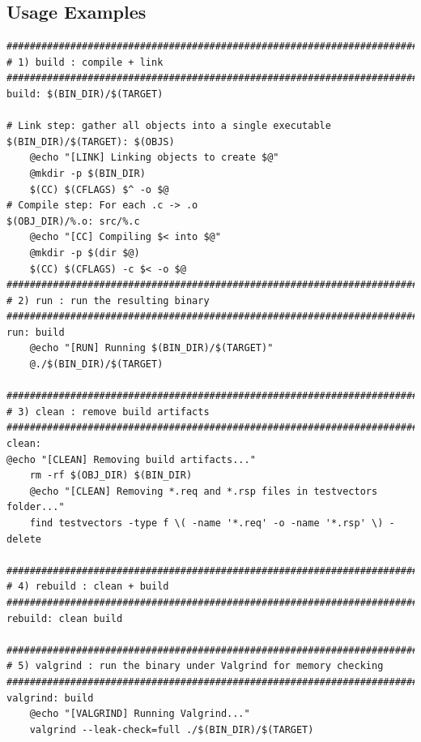 \documentclass[11pt,a4paper]{report}
\theoremstyle{definitionstyle}
\begin{document}
\newpage
\subsection{Usage Examples}
\begin{lstlisting}[numbers=none]
###############################################################################
# 1) build : compile + link
###############################################################################
build: $(BIN_DIR)/$(TARGET)

# Link step: gather all objects into a single executable
$(BIN_DIR)/$(TARGET): $(OBJS)
	@echo "[LINK] Linking objects to create $@"
	@mkdir -p $(BIN_DIR)
	$(CC) $(CFLAGS) $^ -o $@
# Compile step: For each .c -> .o
$(OBJ_DIR)/%.o: src/%.c
	@echo "[CC] Compiling $< into $@"
	@mkdir -p $(dir $@)
	$(CC) $(CFLAGS) -c $< -o $@
###############################################################################
# 2) run : run the resulting binary
###############################################################################
run: build
	@echo "[RUN] Running $(BIN_DIR)/$(TARGET)"
	@./$(BIN_DIR)/$(TARGET)

###############################################################################
# 3) clean : remove build artifacts
###############################################################################
clean:
@echo "[CLEAN] Removing build artifacts..."
	rm -rf $(OBJ_DIR) $(BIN_DIR)
	@echo "[CLEAN] Removing *.req and *.rsp files in testvectors folder..."
	find testvectors -type f \( -name '*.req' -o -name '*.rsp' \) -delete

###############################################################################
# 4) rebuild : clean + build
###############################################################################
rebuild: clean build

###############################################################################
# 5) valgrind : run the binary under Valgrind for memory checking
###############################################################################
valgrind: build
	@echo "[VALGRIND] Running Valgrind..."
	valgrind --leak-check=full ./$(BIN_DIR)/$(TARGET)
\end{lstlisting}
\end{document}
